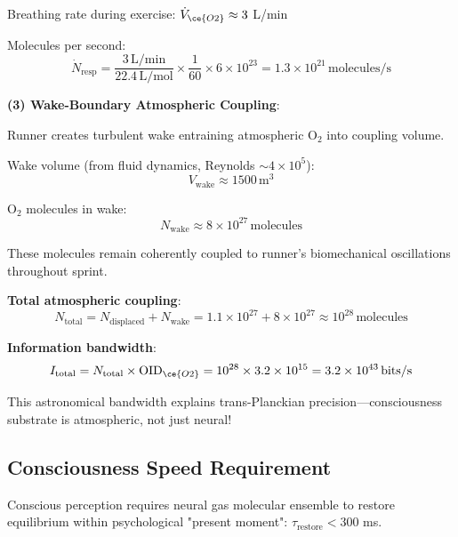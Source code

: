 \documentclass[11pt,onecolumn]{article}
\begin{document}
Breathing rate during exercise: $\dot{V}_{\ce{O2}} \approx 3$ L/min

Molecules per second:
\begin{equation}
\dot{N}_{\text{resp}} = \frac{3\,\text{L/min}}{22.4\,\text{L/mol}} \times \frac{1}{60} \times 6 \times 10^{23} = 1.3 \times 10^{21}\,\text{molecules/s}
\end{equation}

\textbf{(3) Wake-Boundary Atmospheric Coupling}:

Runner creates turbulent wake entraining atmospheric O$_2$ into coupling volume.

Wake volume (from fluid dynamics, Reynolds $\sim 4 \times 10^5$):
\begin{equation}
V_{\text{wake}} \approx 1500\,\text{m}^3
\end{equation}

O$_2$ molecules in wake:
\begin{equation}
N_{\text{wake}} \approx 8 \times 10^{27}\,\text{molecules}
\end{equation}

These molecules remain coherently coupled to runner's biomechanical oscillations throughout sprint.

\textbf{Total atmospheric coupling}:
\begin{equation}
N_{\text{total}} = N_{\text{displaced}} + N_{\text{wake}} = 1.1 \times 10^{27} + 8 \times 10^{27} \approx 10^{28}\,\text{molecules}
\end{equation}

\textbf{Information bandwidth}:
\begin{equation}
I_{\text{total}} = N_{\text{total}} \times \text{OID}_{\ce{O2}} = 10^{28} \times 3.2 \times 10^{15} = 3.2 \times 10^{43}\,\text{bits/s}
\end{equation}

This astronomical bandwidth explains trans-Planckian precision---consciousness substrate is atmospheric, not just neural!

\subsection{Consciousness Speed Requirement}

\begin{theorem}
Conscious perception requires neural gas molecular ensemble to restore equilibrium within psychological "present moment": $\tau_{\text{restore}} < 300$ ms.
\end{theorem}
\end{document}
